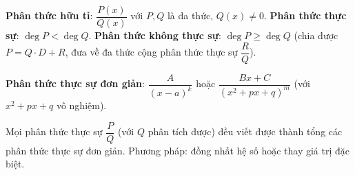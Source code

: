 \documentclass[12pt,a4paper]{article}
\begin{document}
\begin{dinhnghia}
  \textbf{Phân thức hữu tỉ}: $\dfrac{P(x)}{Q(x)}$ với $P, Q$ là đa thức, $Q(x) \ne 0$. \textbf{Phân thức thực sự}: $\deg P < \deg Q$. \textbf{Phân thức không thực sự}: $\deg P \ge \deg Q$ (chia được $P = Q \cdot D + R$, đưa về đa thức cộng phân thức thực sự $\dfrac{R}{Q}$).
\end{dinhnghia}

\begin{dinhnghia}
  \textbf{Phân thức thực sự đơn giản}: $\dfrac{A}{(x - a)^k}$ hoặc $\dfrac{Bx + C}{(x^2 + px + q)^m}$ (với $x^2 + px + q$ vô nghiệm).
\end{dinhnghia}

\begin{dinhly}[title={Phân tích thành tổng phân thức đơn giản}]
  Mọi phân thức thực sự $\dfrac{P}{Q}$ (với $Q$ phân tích được) đều viết được thành tổng các phân thức thực sự đơn giản. Phương pháp: đồng nhất hệ số hoặc thay giá trị đặc biệt.
\end{dinhly}
\end{document}

